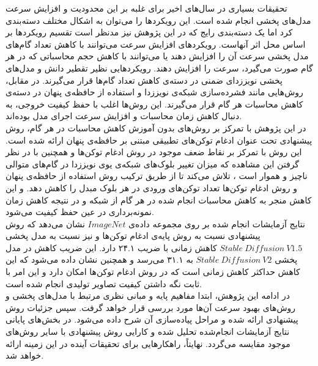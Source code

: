 تحقیقات بسیاری در سال‌های اخیر برای غلبه بر این محدودیت و افزایش سرعت مدل‌های پخشی انجام شده است. این رویکردها را می‌توان به اشکال مختلف دسته‌بندی کرد اما یک دسته‌بندی رایج که در این پژوهش نیز مدنظر است تقسیم رویکردها بر اساس محل اثر آنهاست. رویکرد‌های افزایش سرعت می‌توانند با کاهش تعداد گام‌های مدل پخشی سرعت آن را افزایش دهند یا می‌توانند با کاهش حجم محاسباتی که در هر گام صورت می‌گیرد، سرعت را افزایش دهند\cite{ma2024deepcache}. رویکردهایی نظیر تقطیر دانش\cite{salimans2022progressive} و مدل‌های پخشی نویززدای ضمنی\cite{song2020denoising} در دسته‌ی کاهش تعداد گام‌ها قرار می‌گیرند. در مقابل، روش‌هایی مانند فشرده‌سازی شبکه‌ی نویززدا و استفاده از حافظه‌ی پنهان در دسته‌ی کاهش محاسبات هر گام قرار می‌گیرند. این روش‌ها اغلب با حفظ کیفیت خروجی، به دنبال کاهش زمان محاسبات و افزایش سرعت اجرای مدل بوده‌اند.  
\\

در این پژوهش با تمرکز بر روش‌های بدون آموزش کاهش محاسبات در هر گام، روش پیشنهادی تحت عنوان ادغام توکن‌های تطبیقی مبتنی بر حافظه‌ی پنهان ارائه شده است. این روش با تمرکز بر نقاط ضعف موجود در روش ادغام توکن‌ها و همچنین با در نظر گرفتن این مشاهده که میزان تغییر بلوک‌های شبکه‌ی یوی نویززدا در گام‌های متوالی ناچیز و هموار است \cite{li2023faster}\cite{ma2024deepcache}، تلاش می‌کند تا از طریق ترکیب روش‌ استفاده از حافظه‌ی پنهان و روش ادغام توکن‌ها تعداد توکن‌های ورودی در هر بلوک مبدل را کاهش دهد. و این کاهش منجر به کاهش محاسبات انجام شده در هر گام از شبکه و در نتیجه کاهش زمان نمونه‌برداری در عین حفظ کیفیت می‌شود.
\\

نتایج آزمایشات انجام شده بر روی مجموعه داده‌ی $ImageNet$\cite{5206848} نشان می‌دهد که روش پیشنهادی نسبت به روش پایه‌ی ادغام توکن‌ها و نیز نسبت به مدل پخشی $Stable\ Diffusion\ V1.5$ \cite{rombach2022high}کاهش زمانی با ضریب ۲۴.۱ دارد. این ضریب کاهش در مدل پخشی $Stable\ Diffusion\ V2$ به ۳۱.۱ می‌رسد و همچنین نشان داده‌ می‌شود که این کاهش حداکثر کاهش زمانی‌ است که در روش ادغام توکن‌ها امکان دارد و این امر با ثابت نگه داشتن کیفیت تصاویر تولیدی انجام شده است.
\\

در ادامه این پژوهش، ابتدا مفاهیم پایه و مبانی نظری مرتبط با مدل‌های پخشی و روش‌های بهبود سرعت آن‌ها مورد بررسی قرار خواهد گرفت. سپس جزئیات روش پیشنهادی ارائه شده و مراحل پیاده‌سازی آن شرح داده می‌شود. در بخش‌های پایانی نتایج آزمایشات انجام‌شده تحلیل شده و کارایی روش پیشنهادی با سایر روش‌های موجود مقایسه می‌گردد. نهایتاً، راهکارهایی برای تحقیقات آینده در این زمینه ارائه خواهد شد.  
